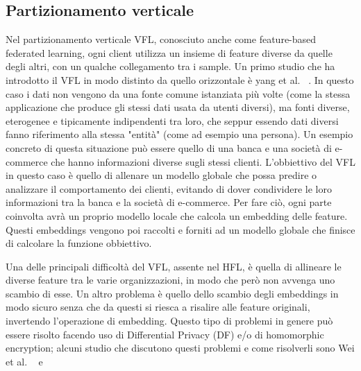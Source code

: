 \subsection{Partizionamento verticale}
Nel partizionamento verticale VFL, conosciuto anche come feature-based 
federated learning, ogni client utilizza un insieme 
di feature diverse da quelle degli altri, con un qualche collegamento 
tra i sample. Un primo studio che ha introdotto il VFL in modo distinto
da quello orizzontale è yang et al. ~\cite{yang2019vfl}.
In questo caso i dati non vengono da una 
fonte comune istanziata più volte (come la stessa applicazione che 
produce gli stessi dati usata da utenti diversi), ma fonti diverse,
eterogenee e tipicamente indipendenti tra loro, che seppur essendo
dati diversi fanno riferimento alla stessa "entità" (come ad esempio
una persona). Un esempio concreto di questa situazione può essere 
quello di una banca e una società di e-commerce che hanno informazioni
diverse sugli stessi clienti. L'obbiettivo del VFL in questo caso è
quello di allenare un modello globale che possa predire o analizzare
il comportamento dei clienti, evitando di dover condividere le loro 
informazioni tra la banca e la società di e-commerce.
Per fare ciò, ogni parte coinvolta avrà un proprio modello locale che 
calcola un embedding delle feature. Questi embeddings vengono poi
raccolti e forniti ad un modello globale che finisce di calcolare la 
funzione obbiettivo.

Una delle principali difficoltà del VFL, assente nel HFL, è quella 
di allineare le diverse feature tra le varie organizzazioni, in 
modo che però non avvenga uno scambio di esse. Un altro problema è 
quello dello scambio degli embeddings in modo sicuro senza che da 
questi si riesca a risalire alle feature originali, invertendo
l'operazione di embedding. Questo tipo di problemi in genere può 
essere risolto facendo uso di Differential Privacy (DF) e/o di 
homomorphic encryption; alcuni studio che discutono questi problemi e
come risolverli sono Wei et al. ~\cite{wei2022vflChallenge} e 
~\cite{liu2022vflChallenge}


